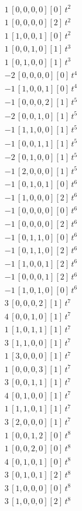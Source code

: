 \begin{align*}
1\,[0,0,0,0] [0]\,t^{2} \\
1\,[0,0,0,0] [2]\,t^{2} \\
1\,[1,0,0,1] [0]\,t^{2} \\
1\,[0,0,1,0] [1]\,t^{3} \\
1\,[0,1,0,0] [1]\,t^{3} \\
-2\,[0,0,0,0] [0]\,t^{4} \\
-1\,[1,0,0,1] [0]\,t^{4} \\
-1\,[0,0,0,2] [1]\,t^{5} \\
-2\,[0,0,1,0] [1]\,t^{5} \\
-1\,[1,1,0,0] [1]\,t^{5} \\
-1\,[0,0,1,1] [1]\,t^{5} \\
-2\,[0,1,0,0] [1]\,t^{5} \\
-1\,[2,0,0,0] [1]\,t^{5} \\
-1\,[0,1,0,1] [0]\,t^{6} \\
-1\,[1,0,0,0] [2]\,t^{6} \\
-1\,[0,0,0,0] [0]\,t^{6} \\
-1\,[0,0,0,0] [2]\,t^{6} \\
-1\,[0,1,1,0] [0]\,t^{6} \\
-1\,[0,1,1,0] [2]\,t^{6} \\
-1\,[1,0,0,1] [2]\,t^{6} \\
-1\,[0,0,0,1] [2]\,t^{6} \\
-1\,[1,0,1,0] [0]\,t^{6} \\
3\,[0,0,0,2] [1]\,t^{7} \\
4\,[0,0,1,0] [1]\,t^{7} \\
1\,[1,0,1,1] [1]\,t^{7} \\
3\,[1,1,0,0] [1]\,t^{7} \\
1\,[3,0,0,0] [1]\,t^{7} \\
1\,[0,0,0,3] [1]\,t^{7} \\
3\,[0,0,1,1] [1]\,t^{7} \\
4\,[0,1,0,0] [1]\,t^{7} \\
1\,[1,1,0,1] [1]\,t^{7} \\
3\,[2,0,0,0] [1]\,t^{7} \\
1\,[0,0,1,2] [0]\,t^{8} \\
1\,[0,0,2,0] [0]\,t^{8} \\
4\,[0,1,0,1] [0]\,t^{8} \\
3\,[0,1,0,1] [2]\,t^{8} \\
3\,[1,0,0,0] [0]\,t^{8} \\
3\,[1,0,0,0] [2]\,t^{8} \\

\end{align*}
